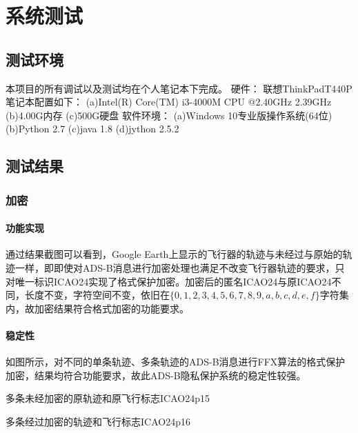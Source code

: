 
\chapter{系统测试}
\section{测试环境}
本项目的所有调试以及测试均在个人笔记本下完成。\newline
硬件：\newline
联想ThinkPadT440P笔记本配置如下：\newline
(a)Intel(R) Core(TM) i3-4000M CPU @2.40GHz 2.39GHz \newline
(b)4.00G内存 \newline
(c)500G硬盘  \newline
软件环境：\newline
(a)Windows 10专业版操作系统(64位)\newline
(b)Python 2.7\newline
(c)java 1.8\newline
(d)jython 2.5.2
\section{测试结果}
\subsection{加密}
\subsubsection{功能实现}
通过结果截图可以看到，Google Earth上显示的飞行器的轨迹与未经过与原始的轨迹一样，即即使对ADS-B消息进行加密处理也满足不改变飞行器轨迹的要求，只对唯一标识ICAO24实现了格式保护加密。加密后的匿名ICAO24与原ICAO24不同，长度不变，字符空间不变，依旧在$\{0,1,2,3,4,5,6,7,8,9,a,b,c,d,e,f\}$字符集内，故加密结果符合格式加密的功能要求。


\subsubsection{稳定性}
如图所示，对不同的单条轨迹、多条轨迹的ADS-B消息进行FFX算法的格式保护加密，结果均符合功能要求，故此ADS-B隐私保护系统的稳定性较强。
\begin{pics}[h]{多条未经加密的原轨迹和原飞行标志ICAO24}{p15}
\end{pics}
\begin{pics}[h]{多条经过加密的轨迹和飞行标志ICAO24}{p16}
\end{pics}

